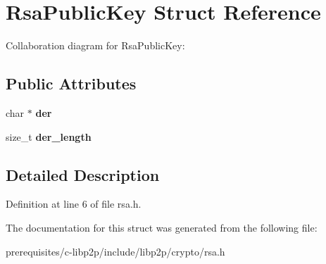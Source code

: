 \hypertarget{struct_rsa_public_key}{}\section{Rsa\+Public\+Key Struct Reference}
\label{struct_rsa_public_key}


Collaboration diagram for Rsa\+Public\+Key\+:
\subsection*{Public Attributes}
\begin{DoxyCompactItemize}
\item 
\mbox{\label{struct_rsa_public_key_aeffc315334ac0d207d1dffa304751a63}} 
char $\ast$ {\bfseries der}
\item 
\mbox{\label{struct_rsa_public_key_a2d079b16f09a32da273d97fb3a516442}} 
size\+\_\+t {\bfseries der\+\_\+length}
\end{DoxyCompactItemize}


\subsection{Detailed Description}


Definition at line 6 of file rsa.\+h.



The documentation for this struct was generated from the following file\+:\begin{DoxyCompactItemize}
\item 
prerequisites/c-\/libp2p/include/libp2p/crypto/rsa.\+h\end{DoxyCompactItemize}
